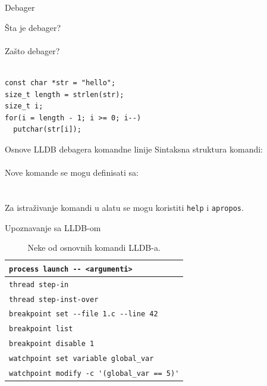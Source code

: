 \documentclass[bookmarks=true,bookmarksopen=true,pdfborder={0 0 0},pdfhighlight={/N},linkbordercolor={.5 .5 .5},implicit=false,unicode,xcolor={table}]{beamer}
\begin{document}
\begin{frame}[fragile]{Debager}

  Šta je debager?\\~\\

  Zašto debager?\\~\\
  
    \begin{lstlisting}
const char *str = "hello";
size_t length = strlen(str);
size_t i;
for(i = length - 1; i >= 0; i--)
  putchar(str[i]);\end{lstlisting}
\end{frame}

\begin{frame}[fragile]{Osnove LLDB debagera komandne linije}
  Sintaksna struktura komandi:
  {\color{mymauve}{
    \verb|<noun> <verb> [-option [value]] [argument [argument...]]|
  }}\\~\\

  
  Nove komande se mogu definisati sa:\\
  {\color{mymauve}{\verb|command alias|}}\\~\\

  Za istraživanje komandi u alatu se mogu koristiti {\color{mymauve}\verb|help|} i {\color{mymauve}\verb|apropos|}.
\end{frame}

\begin{frame}[fragile]{Upoznavanje sa LLDB-om}
  \begin{table}[h!]
    \begin{center}
      \caption{Neke od osnovnih komandi LLDB-a.}
      \small
      \begin{tabular}{|>{\color{mymauve}}l|}
        \hline
	\verb|process launch -- <argumenti>|
	\\ \hline
	\verb|thread step-in|
	\\ \hline
	\verb|thread step-inst-over|
	\\ \hline
	\verb|breakpoint set --file 1.c --line 42|
	\\ \hline
	\verb|breakpoint list|
	\\ \hline
	\verb|breakpoint disable 1|
	\\ \hline
        \verb|watchpoint set variable global_var|
        \\ \hline
        \verb|watchpoint modify -c '(global_var == 5)'|
        \\ \hline
      \end{tabular}
    \end{center}
  \end{table}
\end{frame}
\end{document}
